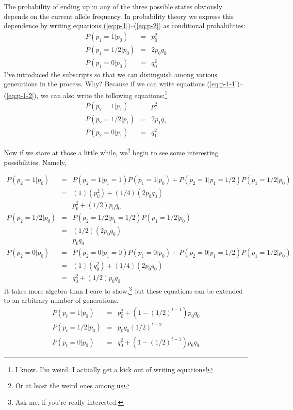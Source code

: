 \documentclass[12pt]{article}
\begin{document}
The probability of ending up in any of the three possible states
obviously depends on the current allele frequency. In probability
theory we express this dependence by writing equations
(\ref{eq:p-1})--(\ref{eq:p-2}) as conditional
probabilities:
\begin{eqnarray}
P(p_1=1|p_0) &=& p_0^2  \label{eq:p-1-1} \\
P(p_1=1/2|p_0) &=& 2p_0q_0 \\
P(p_1=0|p_0) &=& q_0^2  \label{eq:p-1-2}
\end{eqnarray}
I've introduced the subscripts so that we can distinguish among
various generations in the process. Why? Because if we can write
equations (\ref{eq:p-1-1})--(\ref{eq:p-1-2}), we can also write the
following equations:\footnote{I know. I'm weird. I actually get a kick
  out of writing equations!}
\begin{eqnarray*}
P(p_2=1|p_1) &=& p_1^2 \\
P(p_2=1/2|p_1) &=& 2p_1q_1 \\
P(p_2=0|p_1) &=& q_1^2
\end{eqnarray*}

Now if we stare at those a little while, we\footnote{Or at least the
weird ones among us} begin to see some interesting
possibilities. Namely,

\begin{eqnarray*}
P(p_2=1|p_0) &=& P(p_2=1|p_1=1)P(p_1=1|p_0) + P(p_2=1|p_1=1/2)P(p_1=1/2|p_0) \\
             &=& (1)(p_0^2) + (1/4)(2p_0q_0) \\
             &=& p_0^2 + (1/2)p_0q_0 \\
P(p_2=1/2|p_0) &=& P(p_2=1/2|p_1=1/2)P(p_1=1/2|p_0) \\
               &=& (1/2)(2p_0q_0) \\
               &=& p_0q_0 \\
P(p_2=0|p_0) &=& P(p_2=0|p_1=0)P(p_1=0|p_0) + P(p_2=0|p_1=1/2)P(p_1=1/2|p_0) \\
             &=& (1)(q_0^2) + (1/4)(2p_0q_0) \\
             &=& q_0^2 + (1/2)p_0q_0
\end{eqnarray*}
It takes more algebra than I care to show,\footnote{Ask me, if you're
  really interested.} but these equations can be extended to an
arbitrary number of generations.
\begin{eqnarray*}
P(p_t=1|p_0) &=& p_0^2 + \left(1 - (1/2)^{t-1}\right)p_0q_0 \\
P(p_t=1/2|p_0) &=& p_0q_0(1/2)^{t-2} \\
P(p_t=0|p_0) &=& q_0^2 + \left(1 - (1/2)^{t-1}\right)p_0q_0
\end{eqnarray*}
\end{document}
